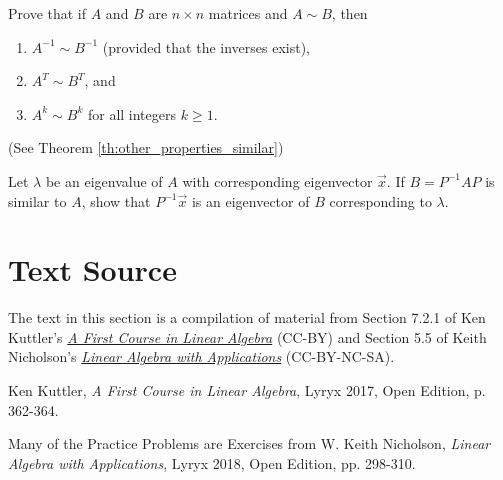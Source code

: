 \documentclass{ximera}
\begin{document}
\begin{problem}\label{prob:similarproperties}
Prove that if $A$ and $B$ are $n\times n$ matrices and $A\sim B$, then
\begin{enumerate}
\item\label{th:properties_similar_inverse} $A^{-1} \sim B^{-1}$ (provided that the inverses exist),
\item\label{th:properties_similar_transpose} $A^T \sim B^T$, and
\item\label{th:properties_similar_powers} $A^k \sim B^k$ for all integers $k \geq 1$.
\end{enumerate} 
(See Theorem \ref{th:other_properties_similar})
\end{problem}



\begin{problem}\label{prob:similarproperties_ev}
Let $\lambda$ be an eigenvalue of $A$ with corresponding eigenvector $\vec{x}$. If $B = P^{-1}AP$ is similar to $A$, show that $P^{-1}\vec{x}$ is an eigenvector of $B$ corresponding to $\lambda$.
\end{problem}



\section*{Text Source}
The text in this section is a compilation of material from Section 7.2.1 of Ken Kuttler's \href{https://open.umn.edu/opentextbooks/textbooks/a-first-course-in-linear-algebra-2017}{\it A First Course in Linear Algebra} (CC-BY) and Section 5.5 of Keith Nicholson's \href{https://open.umn.edu/opentextbooks/textbooks/linear-algebra-with-applications}{\it Linear Algebra with Applications} (CC-BY-NC-SA).

Ken Kuttler, {\it  A First Course in Linear Algebra}, Lyryx 2017, Open Edition, p. 362-364.

Many of the Practice Problems are Exercises from 
W. Keith Nicholson, {\it Linear Algebra with Applications}, Lyryx 2018, Open Edition, pp. 298-310.
\end{document}
